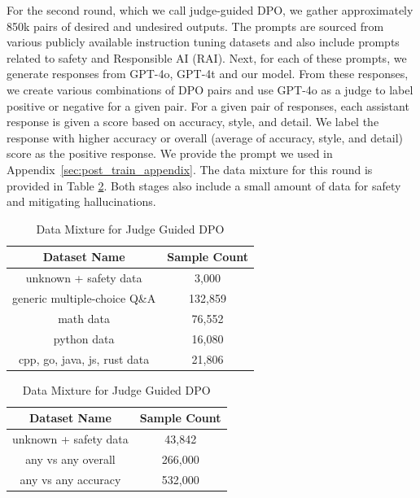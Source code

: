 \documentclass[11pt]{article}
\begin{document}
For the second round, which we call judge-guided DPO, we gather approximately 850k pairs of desired and undesired outputs. The prompts are sourced from various publicly available instruction tuning datasets and also include prompts related to safety and Responsible AI (RAI).
Next, for each of these prompts, we generate responses from GPT-4o, GPT-4t and our model. From these responses, we create various combinations of DPO pairs and use GPT-4o as a judge to label positive or negative for a given pair. For a given pair of responses, each assistant response is given a score based on accuracy, style, and detail. 
We label the response with higher accuracy or overall (average of accuracy, style, and detail) score as the positive response. We provide the prompt we used in Appendix~\ref{sec:post_train_appendix}. The data mixture for this round is provided in Table \ref{tab:training_data_table_2}.
Both stages also include a small amount of data for safety and mitigating hallucinations.


\begin{table}[t!]
\centering
\small
\begin{minipage}{0.48\textwidth}
\centering
\begin{tabular}{@{}cc@{}}
\toprule
\textbf{Dataset Name} & \textbf{Sample Count} \\
\midrule
unknown + safety data & 3,000 \\
generic multiple-choice Q\&A & 132,859 \\
math data & 76,552 \\
python data & 16,080 \\
cpp, go, java, js, rust data & 21,806 \\
\bottomrule
\end{tabular}
\caption{Data Mixture for Pivotal Token DPO}
\label{tab:training_data_table_1}
\end{minipage}
\hfill
\begin{minipage}{0.48\textwidth}
\centering
\begin{tabular}{@{}cc@{}}
\toprule
\textbf{Dataset Name} & \textbf{Sample Count} \\
\midrule
unknown + safety data & 43,842 \\
any vs any overall & 266,000 \\
any vs any accuracy & 532,000 \\
\bottomrule
\end{tabular}
\caption{Data Mixture for Judge Guided DPO}
\label{tab:training_data_table_2}
\end{minipage}
\end{table}
\end{document}
